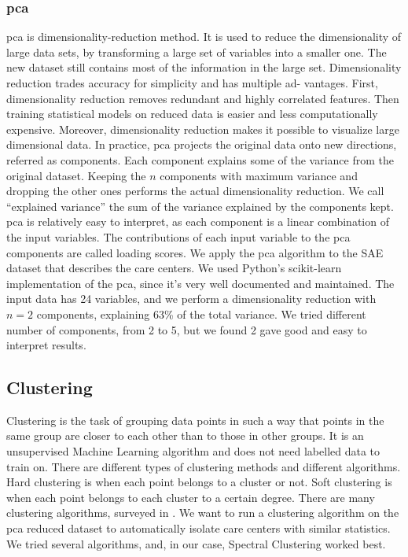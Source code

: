 \subsubsection{\acf{pca}}

\ac{pca} is dimensionality-reduction method. It is used to reduce the
dimensionality of large data sets, by transforming a large set of variables into
a smaller one. The new dataset still contains most of the information in the
large set. Dimensionality reduction trades accuracy for simplicity and has
multiple ad- vantages. First, dimensionality reduction removes redundant and
highly correlated features. Then training statistical models on reduced data is
easier and less computationally expensive. Moreover, dimensionality reduction
makes it possible to visualize large dimensional data. In practice, \ac{pca}
projects the original data onto new directions, referred as components. Each
component explains some of the variance from the original dataset. Keeping the
$n$ components with maximum variance and dropping the other ones performs the
actual dimensionality reduction. We call ``explained variance'' the sum of the
variance explained by the components kept. \ac{pca} is relatively easy to
interpret, as each component is a linear combination of the input variables. The
contributions of each input variable to the \ac{pca} components are called
loading scores. We apply the \ac{pca} algorithm to the SAE dataset that
describes the care centers. We used Python's scikit-learn
\cite{pedregosa_scikit-learn_2011} implementation of the \ac{pca}, since it's
very well documented and maintained. The input data has 24 variables, and we
perform a dimensionality reduction with $n=2$ components, explaining 63\% of the
total variance. We tried different number of components, from 2 to 5, but we
found 2 gave good and easy to interpret results.
\subsection{Clustering}

Clustering is the task of grouping data points in such a way that points in the
same group are closer to each other than to those in other groups. It is an
unsupervised Machine Learning algorithm and does not need labelled data to train
on. There are different types of clustering methods and different algorithms.
Hard clustering is when each point belongs to a cluster or not. Soft clustering
is when each point belongs to each cluster to a certain degree. There are many
clustering algorithms, surveyed in \cite{xu_comprehensive_2015}. We want to run
a clustering algorithm on the \ac{pca} reduced dataset to automatically isolate
care centers with similar statistics. We tried several algorithms, and, in our
case, Spectral Clustering \cite{luxburg_tutorial_2007} worked best.

